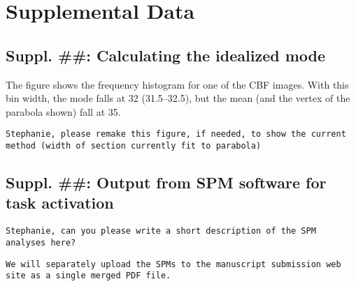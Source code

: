 \section*{Supplemental Data}

\subsection{Suppl. ##: Calculating the idealized mode}
The figure shows the frequency histogram for one of the CBF images. With this bin width, the mode falls at 32 (31.5--32.5), but the mean (and the vertex of the parabola shown) fall at 35. 

\verb|Stephanie, please remake this figure, if needed, to show the current method (width of section currently fit to parabola)|

\subsection{Suppl. ##: Output from SPM software for task activation}
\verb|Stephanie, can you please write a short description of the SPM analyses here?|

\verb|We will separately upload the SPMs to the manuscript submission web site as a single merged PDF file.|

